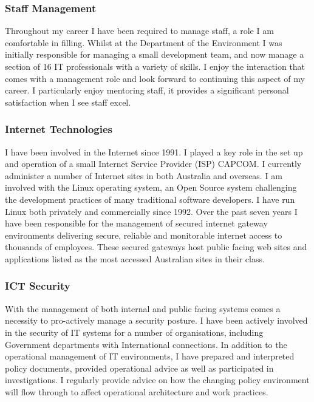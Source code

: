\documentclass[]{friggeri-cv} %
\begin{document}
\subsubsection*{Staff Management}
Throughout my career I have been required to manage staff, a role I am comfortable in filling. Whilst at the Department of the Environment I was initially responsible for managing a small development team, and now manage a section of 16 IT professionals with a variety of skills.  I enjoy the interaction that comes with a management role and look forward to continuing this aspect of my career.  I particularly enjoy mentoring staff, it provides a significant personal satisfaction when I see staff excel.

\subsubsection*{Internet Technologies}
I have been involved in the Internet since 1991. I played a key role in the set up and operation of a small Internet Service Provider (ISP) CAPCOM. I currently administer a number of Internet sites in both Australia and overseas. I am involved with the Linux operating system, an Open Source system challenging the development practices of many traditional software developers. I have run Linux both privately and commercially since 1992. Over the past seven years I have been responsible for the management of secured internet gateway environments delivering secure, reliable and monitorable internet access to thousands of employees. These secured gateways host public facing web sites and applications listed as the most accessed Australian sites in their class.

\subsubsection*{ICT Security}
With the management of both internal and public facing systems comes a necessity to pro-actively manage a security posture. I have been actively involved in the security of IT systems for a number of organisations, including Government departments with International connections. In addition to the operational management of IT environments, I have prepared and interpreted policy documents, provided operational advice as well as participated in investigations. I regularly provide advice on how the changing policy environment will flow through to affect operational architecture and work practices.
\end{document}
